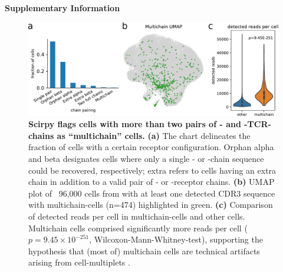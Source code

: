 \documentclass{article}
\begin{document}
\begin{center}
    \normalfont\Large\bfseries{Supplementary Information}
\end{center}
\vspace*{60pt}

\begin{figure}[!hb]
  \centering
  \includegraphics[width=7in]{../figures/multichains.pdf}
  \caption{
    \textbf{Scirpy flags cells with more than two pairs of \textalpha- and \textbeta-TCR-chains as “multichain” cells.} 
    \textbf{(a)} The chart delineates the fraction of
    cells with a certain receptor configuration. Orphan alpha and beta designates cells 
    where only a single \textalpha- or \textbeta-chain sequence could be recovered, 
    respectively; extra refers to cells having an extra chain in addition to a valid pair of
    \textalpha- or \textbeta-receptor chains. 
    \textbf{(b)} UMAP plot of ~96,000 cells from \textcite{Wu2020-vp} with at
    least one detected CDR3 sequence with multichain-cells (n=474) highlighted in green.
    \textbf{(c)} Comparison of detected reads per cell in multichain-cells and other cells.
    Multichain cells comprised significantly more reads per cell
    ($p=9.45 \times 10^{-251}$, Wilcoxon-Mann-Whitney-test), supporting the hypothesis 
    that (most of) multichain cells are technical artifacts arising from 
    cell-multiplets \cite{Ilicic2016-ny}. }
\end{figure}
\end{document}
